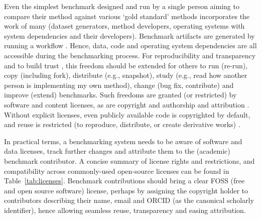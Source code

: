 \documentclass[11pt]{article}
\begin{document}
Even the simplest benchmark designed and run by a single person aiming to compare their method against various `gold standard' methods incorporates the work of many (dataset generators, method developers, operating systems with system dependencies and their developers). Benchmark artifacts are generated by running a workflow \cite{Jackson2021-ke}. Hence, data, code and operating system dependencies are all accessible during the benchmarking process. For reproducibility and transparency and to build trust \cite{Laine2007-py}, this freedom should be extended for others to run (re-run), copy (including fork), distribute (e.g., snapshot), study (e.g., read how another person is implementing my own method), change (bug fix, contribute) and improve (extend) benchmarks. Such freedoms are granted (or restricted) by software and content licenses, as are copyright and authorship and attribution \cite{Kreutzer2014-ua}. Without explicit licenses, even publicly available code is copyrighted by default, and reuse is restricted (to reproduce, distribute, or create derivative works) \cite{Kreutzer2014-ua}. 

In practical terms, a benchmarking system needs to be aware of software and data licenses, track further changes and attribute them to the (academic) benchmark contributor. A concise summary of license rights and restrictions, and compatibility across commonly-used open-source licenses can be found in Table~\ref{tab:licenses}. Benchmark contributions should bring a clear FOSS (free and open source software) license, perhaps by assigning the copyright holder to contributors describing their name, email and  ORCID (as the canonical scholarly identifier), hence allowing seamless reuse, transparency and easing attribution.
\end{document}
